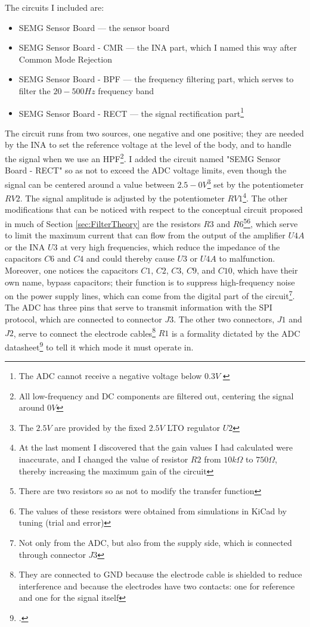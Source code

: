 \documentclass[a4paper, 10pt, final]{article} %
\newcommand{\parenciteit}[2]{\textit{\parencite[#1]{#2}}} %
\begin{document}
    \noindent The circuits I included are:
    \begin{itemize}
        \item SEMG Sensor Board --- the sensor board
        \item SEMG Sensor Board - CMR --- the INA part, which I named this way after Common Mode Rejection
        \item SEMG Sensor Board - BPF --- the frequency filtering part, which serves to filter the $20-500Hz$ frequency band
        \item SEMG Sensor Board - RECT --- the signal rectification part\footnote{The ADC cannot receive a negative voltage below $0.3V$ \parenciteit{p8}{TLV2541:Datasheet}}
    \end{itemize}
    The circuit runs from two sources, one negative and one positive; they are needed by the INA to set the reference voltage at the level of the body, and to handle the signal when we use an HPF\footnote{All low-frequency and DC components are filtered out, centering the signal around $0V$}.
    I added the circuit named "SEMG Sensor Board - RECT" so as not to exceed the ADC voltage limits, even though the signal can be centered around a value between $2.5-0V$\footnote{The $2.5V$ are provided by the fixed $2.5V$ LTO regulator $U2$} set by the potentiometer $RV2$.
    The signal amplitude is adjusted by the potentiometer $RV1$\footnote{At the last moment I discovered that the gain values I had calculated were inaccurate, and I changed the value of resistor $R2$ from $10k\Omega$ to $750\Omega$, thereby increasing the maximum gain of the circuit}.
    The other modifications that can be noticed with respect to the conceptual circuit proposed in much of Section \ref{sec:FilterTheory} are the resistors $R3$ and $R6$\footnote{There are two resistors so as not to modify the transfer function}\:\footnote{The values of these resistors were obtained from simulations in KiCad by tuning (trial and error)}, which serve to limit the maximum current that can flow from the output of the amplifier $U4A$ or the INA $U3$ at very high frequencies, which reduce the impedance of the capacitors $C6$ and $C4$ and could thereby cause $U3$ or $U4A$ to malfunction.
    Moreover, one notices the capacitors $C1$, $C2$, $C3$, $C9$, and $C10$, which have their own name, bypass capacitors; their function is to suppress high-frequency noise on the power supply lines, which can come from the digital part of the circuit\footnote{Not only from the ADC, but also from the supply side, which is connected through connector $J3$}.
    The ADC has three pins that serve to transmit information with the SPI protocol, which are connected to connector $J3$.
    The other two connectors, $J1$ and $J2$, serve to connect the electrode cables\footnote{They are connected to GND because the electrode cable is shielded to reduce interference and because the electrodes have two contacts: one for reference and one for the signal itself}
    $R1$ is a formality dictated by the ADC datasheet\footcite[p5,p21]{TLV2541:Datasheet} to tell it which mode it must operate in.
\end{document}
